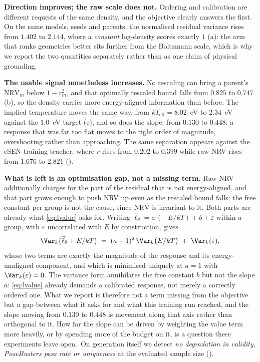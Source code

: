 \textbf{Direction improves; the raw scale does not.} Ordering and calibration are different requests
of the same density, and the objective clearly answers the first. On the same models, seeds and
parents, the normalised residual variance rises from $1.402$ to $2.144$, where a \emph{constant}
log-density scores exactly $1$ (a): the arm that ranks geometries better sits
further from the Boltzmann scale, which is why we report the two quantities separately rather than
as one claim of physical grounding.

\textbf{The usable signal nonetheless increases.} No rescaling can bring a parent's
$\mathrm{NRV}_m$ below $1 - r_m^2$, and that optimally rescaled bound falls from $0.825$ to $0.747$
(b), so the density carries more energy-aligned information than before. The implied temperature moves the same way, from
$kT_{\mathrm{eff}} = 8.02$~eV to $2.34$~eV against the $1.0$~eV target (c),
and so does the slope, from $0.130$ to $0.448$: a response that was far too flat moves to the right
order of magnitude, overshooting rather than approaching. The same separation
appears against the eSEN training teacher, where $r$ rises from $0.202$ to $0.399$ while raw NRV
rises from $1.676$ to $2.821$ ().

\textbf{What is left is an optimisation gap, not a missing term.} Raw NRV additionally charges for
the part of the residual that is not energy-aligned, and that part grows enough to push NRV up even
as the rescaled bound falls; the free constant per group is not the cause, since $\mathrm{NRV}$ is
invariant to it. Both parts are already what \eqref{eq:lvalue} asks for. Writing
$\widehat{\ell}_\theta = a\,(-E/kT) + b + \varepsilon$ within a group, with $\varepsilon$ uncorrelated with
$E$ by construction, gives
\begin{equation}
  \Var_k\bigl(\widehat{\ell}_\theta + E/kT\bigr) \;=\; (a-1)^2\,\Var_k\bigl(E/kT\bigr) \;+\; \Var_k(\varepsilon),
  \label{eq:scaledecomp}
\end{equation}
whose two terms are exactly the magnitude of the response and its energy-unaligned component, and
which is minimised uniquely at $a = 1$ with $\Var_k(\varepsilon) = 0$. The variance form annihilates
the free constant $b$ but not the slope $a$: \eqref{eq:lvalue} already demands a calibrated
response, not merely a correctly ordered one. What we report is therefore not a term missing from
the objective but a gap between what it asks for and what this training run reached, and the
slope moving from $0.130$ to $0.448$ is movement along that axis rather than orthogonal to it. How far the slope can be driven by weighting the value term
more heavily, or by spending more of the budget on it, is a question these experiments leave open.\label{sec:generation}\ On generation itself we detect \emph{no
degradation in validity, PoseBusters pass rate \citep{posebusters} or uniqueness} at the evaluated
sample size ().




